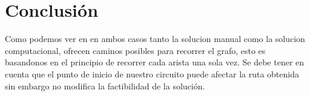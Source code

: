 \section{Conclusión}

Como podemos ver en en ambos casos tanto la solucion manual como la solucion computacional,
ofrecen caminos posibles para recorrer el grafo, esto es basandonos en el principio de recorrer
cada arista una sola vez. Se debe tener en cuenta que el punto de inicio de nuestro circuito
puede afectar la ruta obtenida sin embargo no modifica la factibilidad de la solución.


